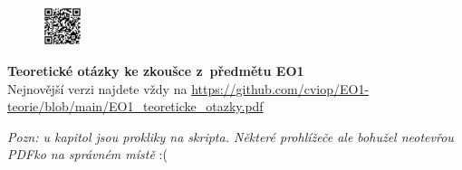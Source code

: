 \documentclass[a4paper,12pt]{article}   %
\begin{document}




\pagestyle{fancy}                                           %
\renewcommand{\headrulewidth}{0.5pt}                        %
\renewcommand{\footrulewidth}{0pt}                          %
\lhead{}        \rhead{}  %
\lfoot{ } \cfoot{ } \rfoot{ }                                  %
\begin{figure}
    \centering
    \includegraphics[width=0.1\textwidth]{git-qr.pdf}
\end{figure}

\begin{center}
    {\Large \textbf{Teoretické otázky ke zkoušce z~předmětu EO1}}\\
    {\normalfont Nejnovější verzi najdete vždy na \url{https://github.com/cviop/EO1-teorie/blob/main/EO1_teoreticke_otazky.pdf}}\\
\end{center}

\textit{Pozn: u kapitol jsou prokliky na skripta. Některé prohlížeče ale bohužel neotevřou PDFko na správném místě} :(


\end{document}

